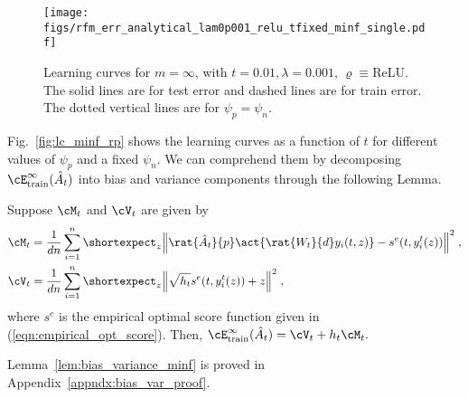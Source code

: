 \begin{figure}[ht]
    \centering
    \texttt{[image: figs/rfm\_err\_analytical\_lam0p001\_relu\_tfixed\_minf\_single.pdf]}
    \caption{Learning curves for $m=\infty$, with $t=0.01,\lambda=0.001$, $\varrho\equiv $ReLU. The solid lines are for test error and dashed lines are for train error. The dotted vertical lines are for $\psi_p=\psi_n$.}
    \label{fig:lc_minf_tfixed}
\end{figure}

Fig.~\ref{fig:lc_minf_rp} shows the learning curves as a function of $t$ for different values of $\psi_p$ and a fixed $\psi_n$. We can comprehend them by decomposing $\cE^\infty_{\text{train}}(\hat{A}_t)$ into bias and variance components through the following Lemma.
\begin{lemma}\label{lem:bias_variance_minf}
    Suppose $\cM_t$ and $\cV_t$ are given by
\begin{align*}
    \cM_t &= \frac{1}{dn}\sum_{i=1}^{n}{\shortexpect_{z}{\norm{\rat{\hat{A}_t}{p}\act{\rat{W_t}{d}y_i(t,z)}-s^e(t,y^t_i(z))}^2}} \;, \\
    \cV_t &= \frac{1}{dn}\sum_{i=1}^{n}{\shortexpect_{z}{\norm{\sqrt{h_t}s^e(t,y^t_i(z))+z}^2}}\;,
\end{align*}
where $s^e$ is the empirical optimal score function given in (\ref{eqn:empirical_opt_score}). Then, $\cE^\infty_{\text{train}}(\hat{A}_t) = \cV_t+h_t\cM_t.$
\end{lemma}
Lemma~\ref{lem:bias_variance_minf} is proved in Appendix~\ref{appndx:bias_var_proof}.


